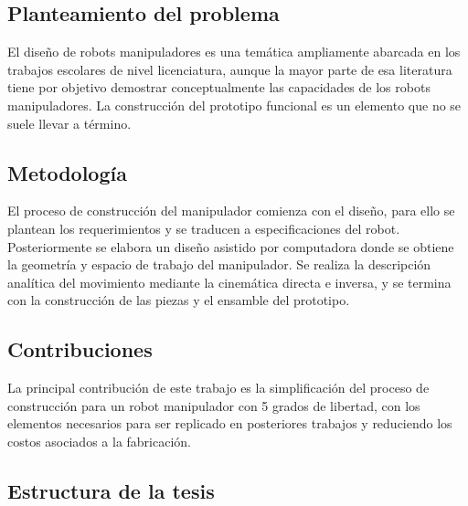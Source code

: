 \subsection{Planteamiento del problema}

El diseño de robots manipuladores es una temática ampliamente abarcada en los trabajos escolares de nivel licenciatura, aunque la mayor parte de esa literatura tiene por objetivo demostrar conceptualmente las capacidades de los robots manipuladores. La construcción del prototipo funcional es un elemento que no se suele llevar a término.
\subsection{Metodología}

El proceso de construcción del manipulador comienza con el diseño, para ello se plantean los requerimientos y se traducen a especificaciones del robot. Posteriormente se elabora un diseño asistido por computadora donde se obtiene la geometría y espacio de trabajo del manipulador. Se realiza la descripción analítica del movimiento mediante la cinemática directa e inversa, y se termina con la construcción de las piezas y el ensamble del prototipo.


\subsection{Contribuciones}

La principal contribución de este trabajo es la simplificación del proceso de construcción para un robot manipulador con 5 grados de libertad, con los elementos necesarios para ser replicado en posteriores trabajos y reduciendo los costos asociados a la fabricación.


\subsection{Estructura de la tesis}

